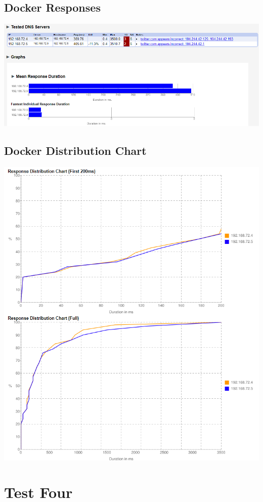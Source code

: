 \documentclass[12pt,twoside]{book}
\begin{document}
\subsection{Docker Responses}
\includegraphics[width=\textwidth]{Appendicies/DockerTest3Result.PNG}

\subsection{Docker Distribution Chart}
\includegraphics[width=\textwidth]{Appendicies/DockerTest3Chart.PNG}


\section{Test Four}
\end{document}
